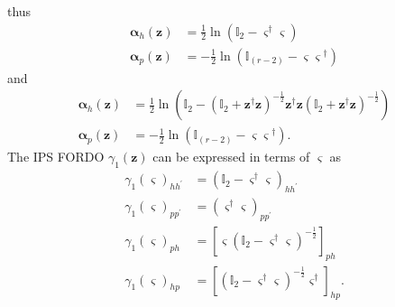 \documentclass[aps,preprint]{revtex4}%
\begin{document}
thus
\begin{align}
\mathbf{\alpha}_{h}\left(  \mathbf{z}\right)   &  =\frac{1}{2}\ln\left(
\mathbb{I}_{2}-\mathbf{\varsigma}^{\dagger}\mathbf{\varsigma}\right)
\nonumber\\
\mathbf{\alpha}_{p}\left(  \mathbf{z}\right)   &  =-\frac{1}{2}\ln\left(
\mathbb{I}_{\left(  r-2\right)  }-\mathbf{\varsigma\varsigma}^{\dagger
}\right)
\end{align}
and%
\begin{align}
\mathbf{\alpha}_{h}\left(  \mathbf{z}\right)   &  =\frac{1}{2}\ln\left(
\mathbb{I}_{2}-\left(  \mathbb{I}_{2}+\mathbf{z}^{\dagger}\mathbf{z}\right)
^{-\frac{1}{2}}\mathbf{z}^{\dagger}\mathbf{z}\left(  \mathbb{I}_{2}%
+\mathbf{z}^{\dagger}\mathbf{z}\right)  ^{-\frac{1}{2}}\right) \nonumber\\
\mathbf{\alpha}_{p}\left(  \mathbf{z}\right)   &  =-\frac{1}{2}\ln\left(
\mathbb{I}_{\left(  r-2\right)  }-\mathbf{\varsigma\varsigma}^{\dagger
}\right)  .
\end{align}
The IPS FORDO $\gamma_{1}\left(  \mathbf{z}\right)  $ can be expressed in
terms of $\mathbf{\varsigma}$ as
\begin{align}
\gamma_{1}\left(  \mathbf{\varsigma}\right)  _{hh^{\prime}}  &  =\left(
\mathbb{I}_{2}-\mathbf{\varsigma}^{\dagger}\mathbf{\varsigma}\right)
_{hh^{\prime}}\nonumber\\
\gamma_{1}\left(  \mathbf{\varsigma}\right)  _{pp^{\prime}}  &  =\left(
\mathbf{\varsigma}^{\dagger}\mathbf{\varsigma}\right)  _{pp^{\prime}%
}\nonumber\\
\gamma_{1}\left(  \mathbf{\varsigma}\right)  _{ph}  &  =\left[
\mathbf{\varsigma}\left(  \mathbb{I}_{2}-\mathbf{\varsigma}^{\dagger
}\mathbf{\varsigma}\right)  ^{-\frac{1}{2}}\right]  _{ph}\nonumber\\
\gamma_{1}\left(  \mathbf{\varsigma}\right)  _{hp}  &  =\left[  \left(
\mathbb{I}_{2}-\mathbf{\varsigma}^{\dagger}\mathbf{\varsigma}\right)
^{-\frac{1}{2}}\mathbf{\varsigma}^{\dagger}\right]  _{hp}.
\end{align}
\end{document}
